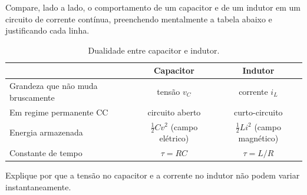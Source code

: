 \blocoaprofundamento

\begin{questao}[3]{}
Compare, lado a lado, o comportamento de um capacitor e de um indutor em um
circuito de corrente contínua, preenchendo mentalmente a tabela abaixo e
justificando cada linha.

\begin{table}[H]
\centering
\small\sffamily
\setlength{\arraystretch}{1.3}
\begin{tabular}{@{}l c c@{}}
\toprule
 & \textbf{Capacitor} & \textbf{Indutor}\\
\midrule
Grandeza que não muda bruscamente & tensão $v_C$ & corrente $i_L$\\
Em regime permanente CC & circuito aberto & curto-circuito\\
Energia armazenada & $\tfrac12 C v^2$ (campo elétrico) & $\tfrac12 L i^2$ (campo magnético)\\
Constante de tempo & $\tau = RC$ & $\tau = L/R$\\
\bottomrule
\end{tabular}
\caption{Dualidade entre capacitor e indutor.}
\end{table}

Explique por que a tensão no capacitor e a corrente no indutor não podem variar
instantaneamente.
\end{questao}

